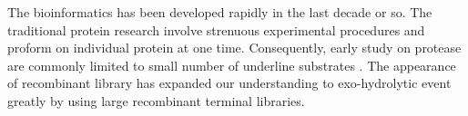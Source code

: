 The bioinformatics has been developed rapidly in the last decade or so. The traditional protein research involve strenuous experimental procedures and proform on individual protein at one time. Consequently, early study on protease are commonly limited to small number of underline substrates . The appearance of recombinant library has expanded our understanding to exo-hydrolytic event greatly by using large recombinant terminal libraries. 